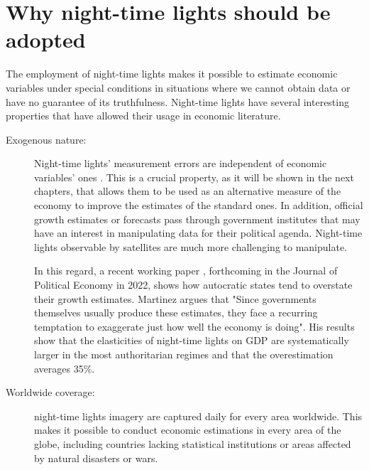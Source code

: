 \section{Why night-time lights should be adopted} %
The employment of night-time lights makes it possible to estimate economic variables under special conditions in situations where we cannot obtain data or have no guarantee of its truthfulness.
Night-time lights have several interesting properties that have allowed their usage in economic literature. 
\begin{description}
  \item[Exogenous nature:]
 Night-time lights' measurement errors are independent of economic variables' ones \citep{hu2022illuminating}. This is a crucial property, as it will be shown in the next chapters, that allows them to be used as an alternative measure of the economy to improve the estimates of the standard ones. In addition, official growth estimates or forecasts pass through government institutes that may have an interest in manipulating data for their political agenda. Night-time lights observable by satellites are much more challenging to manipulate. 
 
In this regard, a recent working paper \citep{martinez2018much}, forthcoming in the Journal of Political Economy in 2022, shows how autocratic states tend to overstate their growth estimates. Martinez argues that "Since governments themselves usually produce these estimates, they face a recurring temptation to exaggerate just how well the economy is doing".
His results show that the elasticities of night-time lights on GDP are systematically larger in the most authoritarian regimes and that the overestimation averages 35\%.
\item[Worldwide coverage:] night-time lights imagery are captured daily for every area worldwide. This makes it possible to conduct economic estimations in every area of the globe, including countries lacking statistical institutions or areas affected by natural disasters or wars. 


\end{description}
